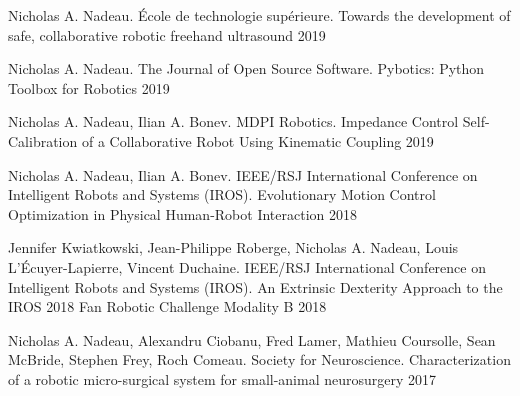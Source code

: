 \begin{cventries}

\cventry
{Nicholas A. Nadeau. École de technologie supérieure.}
{Towards the development of safe, collaborative robotic freehand ultrasound}
{}
{2019}
{}

\cventry
{Nicholas A. Nadeau. The Journal of Open Source Software.}
{Pybotics: Python Toolbox for Robotics}
{}
{2019}
{}

\cventry
{Nicholas A. Nadeau, Ilian A. Bonev. MDPI Robotics.}
{Impedance Control Self-Calibration of a Collaborative Robot Using Kinematic Coupling}
{}
{2019}
{}

\cventry
{Nicholas A. Nadeau, Ilian A. Bonev. IEEE/RSJ International Conference on Intelligent Robots and Systems (IROS).}
{Evolutionary Motion Control Optimization in Physical Human-Robot Interaction}
{}
{2018}
{}

\cventry
{Jennifer Kwiatkowski, Jean-Philippe Roberge, Nicholas A. Nadeau, Louis L'Écuyer-Lapierre, Vincent Duchaine. IEEE/RSJ International Conference on Intelligent Robots and Systems (IROS).}
{An Extrinsic Dexterity Approach to the IROS 2018 Fan Robotic Challenge Modality B}
{}
{2018}
{}

\cventry
{Nicholas A. Nadeau, Alexandru Ciobanu, Fred Lamer, Mathieu Coursolle, Sean McBride, Stephen Frey, Roch Comeau. Society for Neuroscience.}
{Characterization of a robotic micro-surgical system for small-animal neurosurgery}
{}
{2017}
{}

\end{cventries}
